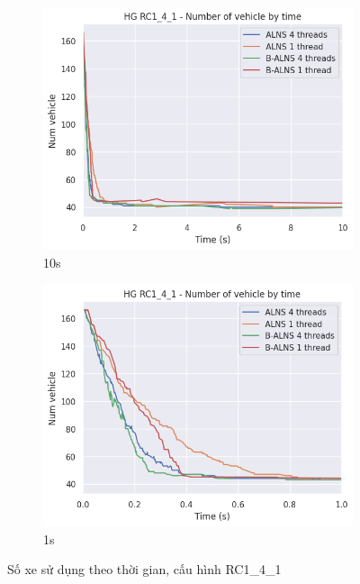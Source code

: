\begin{figure}[H] %
  \label{fig:perf_ct_rc1}
  \begin{subfigure}{.5\textwidth}
    \centering
    \includegraphics[width=0.9\linewidth]{figures/nv_time_10s_RC1_4_1.png}
    \caption{10s}
    \label{fig:perf_ct_rc1_4_10s}
  \end{subfigure}%
  \begin{subfigure}{.5\textwidth}
    \centering
    \includegraphics[width=0.9\linewidth]{figures/nv_time_1s_RC1_4_1.png}
    \caption{1s}
    \label{fig:perf_ct_rc1_4_1s}
  \end{subfigure}
  \caption{Số xe sử dụng theo thời gian, cấu hình RC1\_4\_1}
\end{figure}
